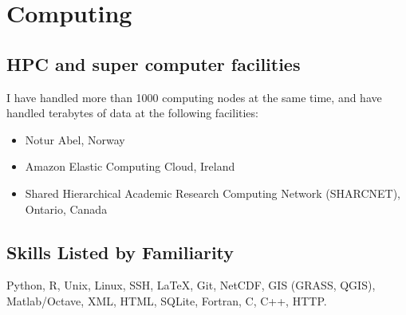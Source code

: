 \section*{Computing}
\subsection*{HPC and super computer facilities}
I have handled more than 1000 computing nodes at the same time, and have handled terabytes of data at the following facilities:
\begin{itemize}
\item Notur Abel, Norway
\item Amazon Elastic Computing Cloud, Ireland
\item Shared Hierarchical Academic Research Computing Network (SHARCNET), Ontario, Canada
\end{itemize}

\subsection*{Skills Listed by Familiarity}
Python, R, Unix, Linux, SSH, \LaTeX, Git, NetCDF, GIS (GRASS, QGIS), Matlab/Octave, XML, HTML, SQLite, Fortran, C, C++, HTTP. 
